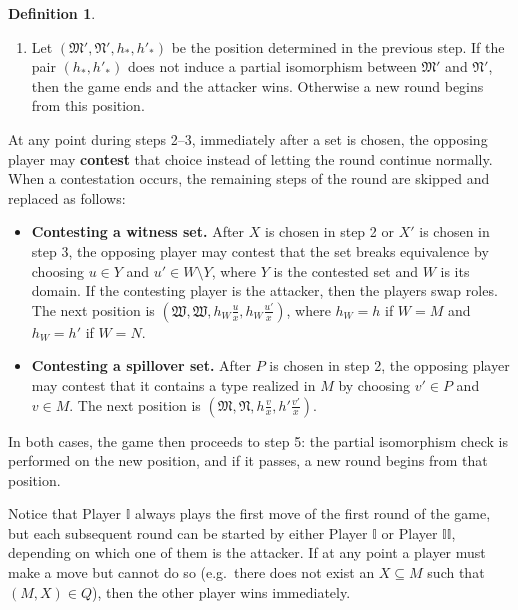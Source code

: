 \documentclass{article}
\theoremstyle{definition}
\newtheorem{definition}[theorem]{Definition}
\begin{document}
\begin{definition}
\begin{enumerate}
\begin{enumerate}
        \end{enumerate}
        \item Let $(\mathfrak{M}',\mathfrak{N}',h_*,h'_*)$ be the position     determined in the previous step. If the pair $(h_*,h'_*)$ does not     induce a partial isomorphism between $\mathfrak{M}'$ and     $\mathfrak{N}'$, then the game ends and the attacker wins. Otherwise
        a new round begins from this position.
    \end{enumerate}
    At any point during steps 2--3, immediately after a set is chosen, the opposing player may \textbf{contest} that choice instead of letting the round continue normally. When a contestation occurs, the remaining steps of the round are skipped and replaced as follows:
    
    \begin{itemize}
        \item \textbf{Contesting a witness set.} After $X$ is chosen in step     2 or $X'$ is chosen in step 3, the opposing player may contest     that the set breaks equivalence by choosing $u \in Y$ and     $u' \in W \setminus Y$, where $Y$ is the contested set and $W$ is     its domain. If the contesting player is the attacker,     then the players swap roles. The next position is     $(\mathfrak{W},\mathfrak{W},h_W\frac{u}{x},h_W\frac{u'}{x})$, where     $h_W=h$ if $W=M$ and $h_W=h'$ if $W=N$.
    
        \item \textbf{Contesting a spillover set.} After $P$ is chosen in     step 2, the opposing player may contest that it contains a     type realized in $M$ by choosing $v' \in P$ and $v \in M$. The next     position is     $(\mathfrak{M},\mathfrak{N},h\frac{v}{x},h'\frac{v'}{x})$.
    \end{itemize}
    In both cases, the game then proceeds to step 5: the partial isomorphism check is performed on the new position, and if it passes, a new round begins from that position.
\end{definition}
Notice that Player $\mathbb{I}$ always plays the first move of the first round of the game, but each subsequent round can be started by either Player $\mathbb{I}$ or Player $\mathbb{II}$, depending on which one of them is the attacker. If at any point a player must make a move but cannot do so (e.g.\ there does not exist an $X\subseteq M$ such that $(M,X)\in Q$), then the other player wins immediately.
\end{document}

